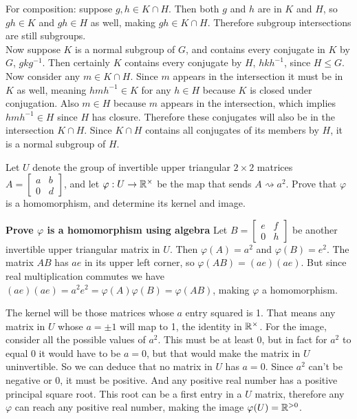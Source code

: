 \documentclass{article}
\begin{document}
For composition: suppose $g, h \in K \cap H$. Then both $g$ and $h$ are in $K$ and $H$, so $gh \in K$ and $gh \in H$ as well, making $gh \in K \cap H$. Therefore subgroup intersections are still subgroups.
\\

Now suppose $K$ is a normal subgroup of $G$, and contains every conjugate in $K$ by $G$, $gkg^{-1}$. Then certainly $K$ contains every conjugate by $H$, $hkh^{-1}$, since $H \leq G$. Now consider any $m \in K \cap H$. Since $m$ appears in the intersection it must be in $K$ as well, meaning $hmh^{-1} \in K$ for any $h \in H$ because $K$ is closed under conjugation. Also $m \in H$ because $m$ appears in the intersection, which implies $hmh^{-1} \in H$ since $H$ has closure. Therefore these conjugates will also be in the intersection $K \cap H$. Since $K \cap H$ contains all conjugates of its members by $H$, it is a normal subgroup of $H$.

\begin{problem}
Let $U$ denote the group of invertible upper triangular $2 \times 2$ matrices $A = \begin{bmatrix} a & b \\ 0 & d \end{bmatrix}$, and let $\varphi: U \to \mathbb{R}^\times$ be the map that sends $A \rightsquigarrow a^2$. Prove that $\varphi$ is a homomorphism, and determine its kernel and image.
\end{problem}

\textbf{Prove $\varphi$ is a homomorphism using algebra}
Let $B = \begin{bmatrix} e & f \\ 0 & h \end{bmatrix}$ be another invertible upper triangular matrix in $U$. Then $\varphi(A) = a^2$ and $\varphi(B) = e^2$. The matrix $AB$ has $ae$ in its upper left corner, so $\varphi(AB) = (ae)(ae)$. But since real multiplication commutes we have $(ae)(ae) = a^2 e^2 = \varphi(A)\varphi(B) = \varphi(AB)$, making $\varphi$ a homomorphism.

The kernel will be those matrices whose $a$ entry squared is 1. That means any matrix in $U$ whose $a = \pm 1$ will map to 1, the identity in $\mathbb{R}^\times$. For the image, consider all the possible values of $a^2$. This must be at least 0, but in fact for $a^2$ to equal 0 it would have to be $a = 0$, but that would make the matrix in $U$ uninvertible. So we can deduce that no matrix in $U$ has $a = 0$. Since $a^2$ can't be negative or 0, it must be positive. And any positive real number has a positive principal square root. This root can be a first entry in a $U$ matrix, therefore any $\varphi$ can reach any positive real number, making the image $\varphi(U) = \mathbb{R}^{>0}$.
\end{document}
